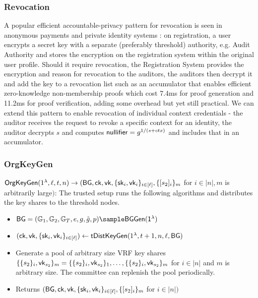 \subsubsection*{Revocation}
A popular efficient accountable-privacy pattern for revocation is seen in anonymous payments \cite{damgard_balancing_2020} and private identity systems \cite{wang2023hades}: on registration, a user encrypts a secret key with a separate (preferably threshold) authority, e.g. Audit Authority and stores the encryption on the registration system within the original user profile. Should it require revocation, the Registration System provides the encryption and reason for revocation to the auditors, the auditors then decrypt it and add the key to a revocation list such as an accumulator that enables efficient zero-knowledge non-membership proofs \cite{jaques_allosaur_2024, galbraith_dynamic_2022} which cost 7.4ms for proof generation and 11.2ms for proof verification, adding some overhead but yet still practical. We can extend this pattern to enable revocation of individual context credentials - the auditor receives the request to revoke a specific context for an identity, the auditor decrypts $s$ and computes $\mathsf{nullifier} = g^{1/(s + ctx)}$ and includes that in an accumulator.


\subsubsection*{OrgKeyGen}

$\mathsf{OrgKeyGen}(1^{\lambda}, \ell, t, n) \to (\mathsf{BG}, \mathsf{ck}, \mathsf{vk}, \{\mathsf{sk}_i, \mathsf{vk}_i\}_{i \in [\ell]}, \{[s_2]_i\}_m$ for $i \in |n|, m$ is arbitrarily large$ ) $: The trusted setup runs the following algorithms and distributes the key shares to the threshold nodes.
    \begin{itemize}
        \item $\BG = (\G_1, \G_2, \G_T, e, g, \tilg, p) \sample \BGGen(\secparam)$
        \item $(\mathsf{ck}, \mathsf{vk}, \{\mathsf{sk}_i, \mathsf{vk}_i\}_{i \in [\ell]}) \gets \mathsf{tDistKeyGen}(1^{\lambda}, t+1, n, \ell, \mathsf{BG})$
        \item Generate a pool of arbitrary size VRF key shares $\{\{s_2\}_i, \mathsf{vk}_{s_2}\}_m = \{\{s_2\}_i, \mathsf{vk}_{s_2}\}_1, \ldots, \{\{s_2\}_i, \mathsf{vk}_{s_2}\}_m$ for $i \in |n|$ and $m$ is arbitrary size. The committee can replenish the pool periodically.
        \item Returns $(\mathsf{BG}, \mathsf{ck}, \mathsf{vk}, \{\mathsf{sk}_i, \mathsf{vk}_i\}_{i \in [\ell]}, \{[s_2]_i\}_m$ for $i \in |n| )$
    \end{itemize}

